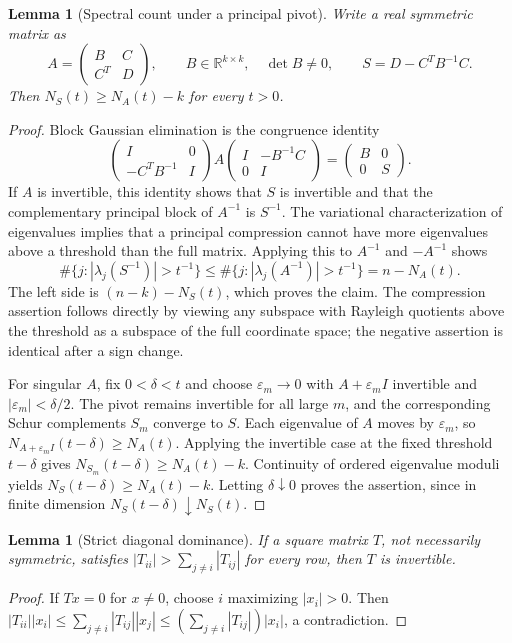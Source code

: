\documentclass[11pt]{article}
\numberwithin{equation}{section}
\newtheorem{lemma}[theorem]{Lemma}
\theoremstyle{definition}\newtheorem{definition}[theorem]{Definition}
\theoremstyle{remark}\newtheorem{remark}[theorem]{Remark}
\newcommand{\R}{\mathbb R}\newcommand{\E}{\mathbb E}\newcommand{\PP}{\mathbb P}
\newcommand{\1}{\mathbf 1}\newcommand{\diag}{\operatorname{diag}}
\begin{document}
\begin{lemma}[Spectral count under a principal pivot]\label{lem:schur}
Write a real symmetric matrix as
\[
 A=\begin{pmatrix}B&C\\C^T&D\end{pmatrix},\qquad B\in\R^{k\times k},\quad\det B\ne0,
 \qquad S=D-C^TB^{-1}C.
\]
Then $N_S(t)\ge N_A(t)-k$ for every $t>0$.
\end{lemma}
\begin{proof}
Block Gaussian elimination is the congruence identity
\[
 \begin{pmatrix}I&0\\-C^TB^{-1}&I\end{pmatrix}
 A\begin{pmatrix}I&-B^{-1}C\\0&I\end{pmatrix}
 =\begin{pmatrix}B&0\\0&S\end{pmatrix}.
\]
If $A$ is invertible, this identity shows that $S$ is invertible and that the complementary principal block of $A^{-1}$ is $S^{-1}$. The variational characterization of eigenvalues implies that a principal compression cannot have more eigenvalues above a threshold than the full matrix. Applying this to $A^{-1}$ and $-A^{-1}$ shows
\[
 \#\{j:|\lambda_j(S^{-1})|>t^{-1}\}
 \le\#\{j:|\lambda_j(A^{-1})|>t^{-1}\}=n-N_A(t).
\]
The left side is $(n-k)-N_S(t)$, which proves the claim. The compression assertion follows directly by viewing any subspace with Rayleigh quotients above the threshold as a subspace of the full coordinate space; the negative assertion is identical after a sign change.

For singular $A$, fix $0<\delta<t$ and choose $\varepsilon_m\to0$ with $A+\varepsilon_m I$ invertible and $|\varepsilon_m|<\delta/2$. The pivot remains invertible for all large $m$, and the corresponding Schur complements $S_m$ converge to $S$. Each eigenvalue of $A$ moves by $\varepsilon_m$, so $N_{A+\varepsilon_m I}(t-\delta)\ge N_A(t)$. Applying the invertible case at the fixed threshold $t-\delta$ gives $N_{S_m}(t-\delta)\ge N_A(t)-k$. Continuity of ordered eigenvalue moduli yields $N_S(t-\delta)\ge N_A(t)-k$. Letting $\delta\downarrow0$ proves the assertion, since in finite dimension $N_S(t-\delta)\downarrow N_S(t)$.
\end{proof}

\begin{lemma}[Strict diagonal dominance]\label{lem:dd}
If a square matrix $T$, not necessarily symmetric, satisfies
$|T_{ii}|>\sum_{j\ne i}|T_{ij}|$ for every row, then $T$ is invertible.
\end{lemma}
\begin{proof}
If $Tx=0$ for $x\ne0$, choose $i$ maximizing $|x_i|>0$. Then
$|T_{ii}||x_i|\le\sum_{j\ne i}|T_{ij}||x_j|\le(\sum_{j\ne i}|T_{ij}|)|x_i|$,
a contradiction.
\end{proof}
\end{document}
